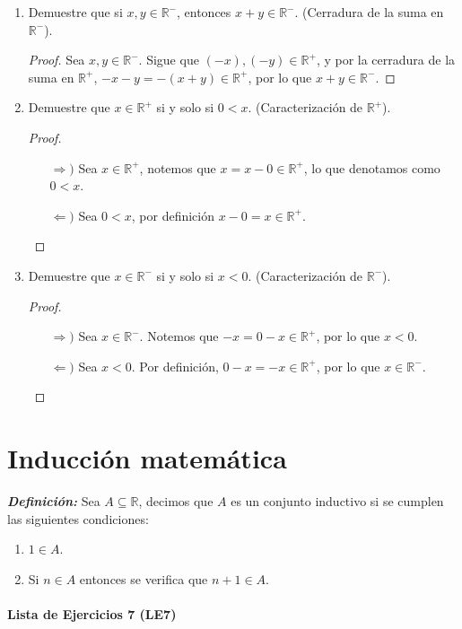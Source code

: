 \documentclass[11pt]{article}
\newcommand{\R}{\mathbb{R}}
\newcommand{\bfit}[1]{\textbf{\textit{#1}}}
\let\subset\subseteq
\begin{document}
\begin{enumerate}[label=\alph*)]
 \item Demuestre que si $x,y \in \R^-$, entonces $x+y\in \R^-$. (Cerradura de la suma en $\R^-$).
 \begin{proof}
 Sea $x,y\in \R^-$. Sigue que $(-x), (-y)\in \R^+$, y por la cerradura de la suma en $\R^+$, $-x-y=-(x+y)\in \R^+$, por lo que $x+y\in \R^-$.
 \end{proof}

 \item Demuestre que $x\in \R^+$ si y solo si $0<x$. (Caracterización de $\R^+$).
 \begin{proof}\leavevmode
 \begin{itemize}
 \item[$\Rightarrow)$] Sea $x\in \R^+$, notemos que $x=x-0\in \R^+$, lo que denotamos como $0<x$.
 \item[$\Leftarrow)$] Sea $0<x$, por definición $x-0=x\in \R^+$. \qedhere
 \end{itemize}
 \end{proof}

 \item Demuestre que $x\in \R^-$ si y solo si $x<0$. (Caracterización de $\R^-$).
 \begin{proof}\leavevmode
 \begin{itemize}
 \item[$\Rightarrow)$] Sea $x\in \R^-$. Notemos que $-x=0-x\in \R^+$, por lo que $x<0$.
 \item[$\Leftarrow)$] Sea $x<0$. Por definición, $0-x=-x\in \R^+$, por lo que $x\in \R^-$. \qedhere
 \end{itemize}
 \end{proof}
\end{enumerate}



\part*{Inducción matemática}

\bfit{Definición:}  Sea $A\subset \R$, decimos que $A$ es un conjunto inductivo si se cumplen las siguientes condiciones:
 \begin{enumerate}[label=\roman*)]
  \item $1 \in A$.
  \item Si $n \in A$ entonces se verifica que $n+1 \in A$.
 \end{enumerate}

\subsection*{Lista de Ejercicios 7 (LE7)}
\end{document}
